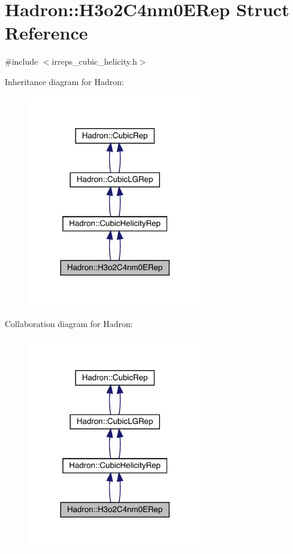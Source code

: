 \hypertarget{structHadron_1_1H3o2C4nm0ERep}{}\section{Hadron\+:\+:H3o2\+C4nm0\+E\+Rep Struct Reference}
\label{structHadron_1_1H3o2C4nm0ERep}


{\ttfamily \#include $<$irreps\+\_\+cubic\+\_\+helicity.\+h$>$}



Inheritance diagram for Hadron\+:\nopagebreak
\begin{figure}[H]
\begin{center}
\leavevmode
\includegraphics[width=216pt]{db/dd1/structHadron_1_1H3o2C4nm0ERep__inherit__graph}
\end{center}
\end{figure}


Collaboration diagram for Hadron\+:\nopagebreak
\begin{figure}[H]
\begin{center}
\leavevmode
\includegraphics[width=216pt]{dd/d3d/structHadron_1_1H3o2C4nm0ERep__coll__graph}
\end{center}
\end{figure}
